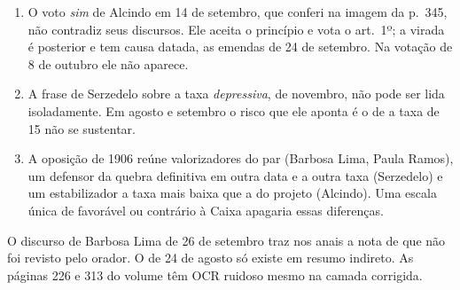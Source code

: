 \begin{enumerate}[leftmargin=*,nosep]
\item O voto \textit{sim} de Alcindo em 14 de setembro, que conferi na imagem
da p.~345, não contradiz seus discursos. Ele aceita o princípio e vota o
art.~1º; a virada é posterior e tem causa datada, as emendas de 24 de setembro.
Na votação de 8 de outubro ele não aparece.
\item A frase de Serzedelo sobre a taxa \textit{depressiva}, de novembro, não
pode ser lida isoladamente. Em agosto e setembro o risco que ele aponta é o de
a taxa de 15 não se sustentar.
\item A oposição de 1906 reúne valorizadores do par (Barbosa Lima, Paula
Ramos), um defensor da quebra definitiva em outra data e a outra taxa
(Serzedelo) e um estabilizador a taxa mais baixa que a do projeto (Alcindo).
Uma escala única de favorável ou contrário à Caixa apagaria essas diferenças.
\end{enumerate}


O discurso de Barbosa Lima de 26 de setembro traz nos anais a nota de que não
foi revisto pelo orador. O de 24 de agosto só existe em resumo indireto. As
páginas 226 e 313 do volume têm OCR ruidoso mesmo na camada corrigida.
